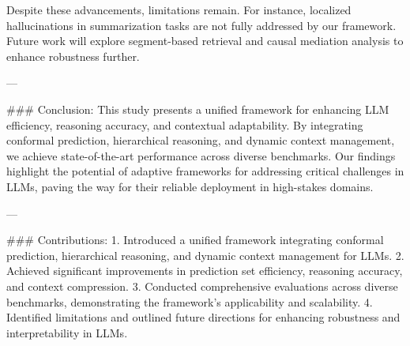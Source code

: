 Despite these advancements, limitations remain. For instance, localized hallucinations in summarization tasks are not fully addressed by our framework. Future work will explore segment-based retrieval and causal mediation analysis to enhance robustness further.

---

### Conclusion:
This study presents a unified framework for enhancing LLM efficiency, reasoning accuracy, and contextual adaptability. By integrating conformal prediction, hierarchical reasoning, and dynamic context management, we achieve state-of-the-art performance across diverse benchmarks. Our findings highlight the potential of adaptive frameworks for addressing critical challenges in LLMs, paving the way for their reliable deployment in high-stakes domains.

---

### Contributions:
1. Introduced a unified framework integrating conformal prediction, hierarchical reasoning, and dynamic context management for LLMs.
2. Achieved significant improvements in prediction set efficiency, reasoning accuracy, and context compression.
3. Conducted comprehensive evaluations across diverse benchmarks, demonstrating the framework's applicability and scalability.
4. Identified limitations and outlined future directions for enhancing robustness and interpretability in LLMs.